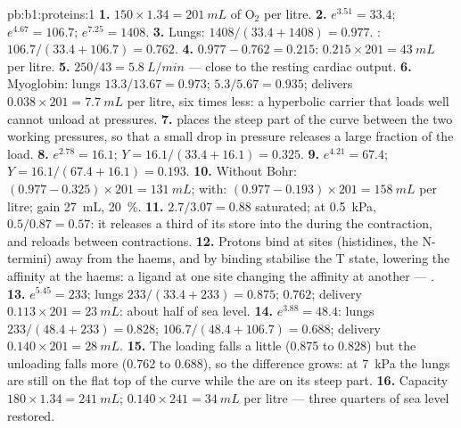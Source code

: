 \begin{solution}{pb:b1:proteins:1}
\textbf{1.} $150\times 1.34 = \qty{201}{mL}$ of $\mathrm{O_2}$ per litre.
\textbf{2.} $e^{3.51} = 33.4$; $e^{4.67} = 106.7$; $e^{7.25} = 1408$.
\textbf{3.} Lungs: $1408/(33.4 + 1408) = 0.977$. :
$106.7/(33.4 + 106.7) = 0.762$.
\textbf{4.} $0.977 - 0.762 = 0.215$: $0.215\times 201 = \qty{43}{mL}$
per litre.
\textbf{5.} $250/43 = \qty{5.8}{L/min}$ --- close to the resting
cardiac output.
\textbf{6.} Myoglobin: lungs $13.3/13.67 = 0.973$; 
$5.3/5.67 = 0.935$; delivers $0.038\times 201 = \qty{7.7}{mL}$ per
litre, six times less: a hyperbolic carrier that loads well cannot
unload at  pressures.
\textbf{7.}  places the steep part of the curve between
the two working pressures, so that a small drop in pressure releases a
large fraction of the load.
\textbf{8.} $e^{2.78} = 16.1$; $Y = 16.1/(33.4 + 16.1) = 0.325$.
\textbf{9.} $e^{4.21} = 67.4$; $Y = 16.1/(67.4 + 16.1) = 0.193$.
\textbf{10.} Without Bohr: $(0.977 - 0.325)\times 201 = \qty{131}{mL}$;
with: $(0.977 - 0.193)\times 201 = \qty{158}{mL}$ per litre; gain
\qty{27}{mL}, \qty{20}{\%}.
\textbf{11.} $2.7/3.07 = 0.88$ saturated; at \qty{0.5}{kPa},
$0.5/0.87 = 0.57$: it releases a third of its store into the
 during the contraction, and reloads between contractions.
\textbf{12.} Protons bind at sites (histidines, the N-termini) away
from the haems, and by binding stabilise the T state, lowering the
affinity at the haems: a ligand at one site changing the affinity at
another --- .
\textbf{13.} $e^{5.45} = 233$; lungs $233/(33.4 + 233) = 0.875$;
 $0.762$; delivery $0.113\times 201 = \qty{23}{mL}$: about half
of sea level.
\textbf{14.} $e^{3.88} = 48.4$: lungs $233/(48.4 + 233) = 0.828$;
 $106.7/(48.4 + 106.7) = 0.688$; delivery $0.140\times 201 =
\qty{28}{mL}$.
\textbf{15.} The loading falls a little (0.875 to 0.828) but the
unloading falls more (0.762 to 0.688), so the difference grows: at
\qty{7}{kPa} the lungs are still on the flat top of the curve while the
 are on its steep part.
\textbf{16.} Capacity $180\times 1.34 = \qty{241}{mL}$; $0.140\times
241 = \qty{34}{mL}$ per litre --- three quarters of sea level restored.

\end{solution}
